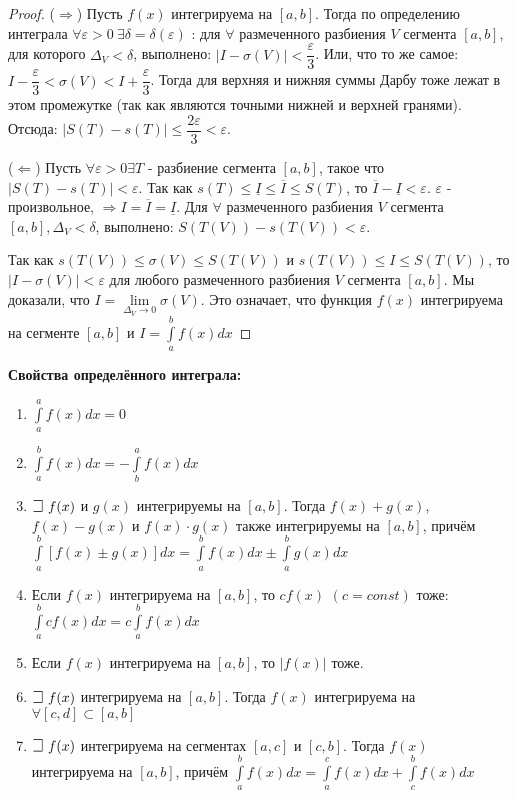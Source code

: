 \begin{proof}

($\Rightarrow$) Пусть $f(x)$ интегрируема на $[a,b]$. Тогда по определению интеграла $\forall \varepsilon > 0~\exists \delta = \delta(\varepsilon)$ : для $\forall$ размеченного разбиения $V$ сегмента $[a, b]$, для которого $\Delta _V < \delta$, выполнено: $|I - \sigma(V)| < \dfrac{\varepsilon}{3}$. Или, что то же самое:$I - \dfrac{\varepsilon}{3} < \sigma(V) < I + \dfrac{\varepsilon}{3}$. 
Тогда для верхняя и нижняя суммы Дарбу тоже лежат в этом промежутке (так как являются точными нижней и верхней гранями). Отсюда: $|S(T) - s(T)| \le \dfrac{2\varepsilon}{3} < \varepsilon$.

($\Leftarrow$) Пусть $\forall \varepsilon > 0 \exists T$ - разбиение сегмента $[a,b]$, такое что $|S(T)-s(T)| < \varepsilon$. Так как $s(T) \le \underline{I} \le \overline{I} \le S(T)$, то $\overline{I} - \underline{I} < \varepsilon$. $\varepsilon$ - произвольное, $\Rightarrow I = \overline{I} = \underline{I}$.
Для $\forall$ размеченного разбиения $V$ сегмента $[a,b], \Delta_V < \delta$, выполнено: $S(T(V)) - s(T(V)) < \varepsilon$. 

Так как $s(T(V)) \le \sigma(V) \le S(T(V))$ и $s(T(V)) \le I \le S(T(V))$, то $|I - \sigma(V)| < \varepsilon$ для любого размеченного разбиения $V$ сегмента $[a,b]$. Мы доказали, что $I = \lim\limits_{\Delta_V \to 0}\sigma(V)$. Это означает, что функция $f(x)$ интегрируема на сегменте $[a,b]$ и $I = \int\limits_a^b f(x)dx$

\end{proof}



\textbf{Свойства определённого интеграла:}
\begin{enumerate}
    \item $\int\limits_a^a f(x)dx = 0$
    \item $\int\limits_a^b f(x)dx = -\int\limits_b^a f(x)dx$
    \item $\mathLet ~ f(x)$ и $g(x)$ интегрируемы на $[a,b]$. Тогда $f(x) + g(x)$, $f(x) - g(x)$ и $f(x) \cdot g(x)$ также интегрируемы на $[a,b]$, причём $\int\limits_a^b [f(x) \pm g(x)]dx = \int\limits_a^b f(x)dx \pm \int\limits_a^b g(x)dx$
    \item Если $f(x)$ интегрируема на $[a, b]$, то $cf(x)$ $(c=const)$ тоже: $\int\limits_a^b cf(x)dx = c\int\limits_a^b f(x)dx$
    \item Если $f(x)$ интегрируема на $[a, b]$, то $|f(x)|$ тоже.
    \item $\mathLet ~ f(x)$ интегрируема на $[a, b]$. Тогда $f(x)$ интегрируема на $\forall [c, d] \subset [a, b]$
    \item $\mathLet ~ f(x)$ интегрируема на сегментах $[a, c]$ и $[c, b]$. Тогда $f(x)$ интегрируема на $[a, b]$, причём $\int\limits_a^b f(x)dx = \int\limits_a^c f(x)dx + \int\limits_c^b f(x)dx$
\end{enumerate}

